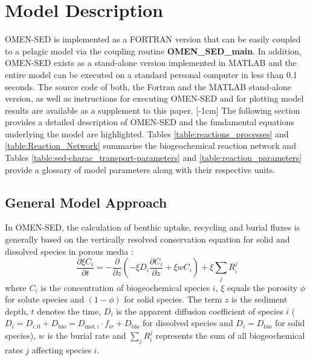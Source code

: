 \documentclass[gmd, manuscript]{copernicus}
\begin{document}
\section{Model Description}\label{sec:model_description}
OMEN-SED is implemented as a FORTRAN version that can be easily coupled to a pelagic model via the coupling routine \textsf{\textbf{OMEN\_SED\_main}}. 
In addition, OMEN-SED exists as a stand-alone version implemented in MATLAB and the entire model can be executed on a standard personal computer in less than 0.1 seconds. 
The source code of both, the Fortran and the MATLAB stand-alone version, as well as instructions for executing OMEN-SED and for plotting model results are available as a supplement to this paper.
[-1cm]%
The following section provides a detailed description of OMEN-SED and the fundamental equations underlying the model are highlighted. 
Tables \ref{table:reactions_processes} and \ref{table:Reaction_Network} summarise the biogeochemical reaction network and Tables \ref{table:sed-charac_transport-parameters} 
and \ref{table:reaction_parameters} provide a glossary of model parameters along with their respective units. 

\subsection {General Model Approach} \label{subsec:GeneralModelApproach}
In OMEN-SED, the calculation of benthic uptake, recycling and burial fluxes is generally based on the vertically resolved conservation equation for solid and dissolved species in porous media 
\citep[e.g.][]{berner_early_1980, boudreau1997diagenetic}:
\begin{equation} 
\frac{\partial \xi C_i}{\partial t}=-\frac{\partial}{\partial z}\left( -\xi D_i \frac{\partial C_i}{\partial z} +\xi w C_i\right)    +\xi \sum_j R_i^j \label{eq:Eq_generaldiagenetic}
\end{equation}
where $C_i$ is the concentration of biogeochemical species $i$, $\xi$ equals the porosity $\phi$ for solute species and $(1-\phi)$ for solid species. The term $z$ is the sediment depth, $t$ denotes the time, 
$D_i$ is the apparent diffusion coefficient of species $i$ ($D_i=D_{i,0}+D_{\mathrm{bio}}=D_{\mathrm{mol},i}\cdot f_{ir}+D_{\mathrm{bio}}$ for dissolved species 
and $D_i=D_{\mathrm{bio}}$ for solid species), $w$ is the burial rate  and $\sum_j R_i^j$ represents the sum of all biogeochemical rates $j$ affecting species $i$. 
\end{document}
